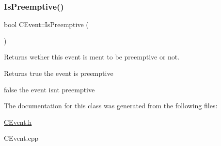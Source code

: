 \subsubsection{\texorpdfstring{Is\+Preemptive()}{IsPreemptive()}}
{\footnotesize\ttfamily bool C\+Event\+::\+Is\+Preemptive (\begin{DoxyParamCaption}{ }\end{DoxyParamCaption})}



Returns wether this event is ment to be preemptive or not. 

\begin{DoxyReturn}{Returns}
true the event is preemptive 

false the event isn\textquotesingle{}t preemptive 
\end{DoxyReturn}


The documentation for this class was generated from the following files\+:\begin{DoxyCompactItemize}
\item 
\hyperlink{CEvent_8h}{C\+Event.\+h}\item 
C\+Event.\+cpp\end{DoxyCompactItemize}
